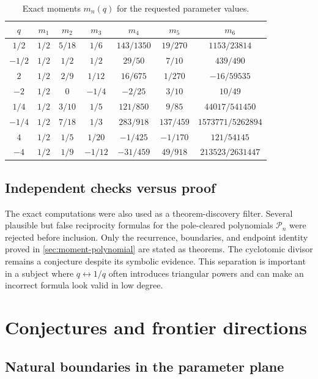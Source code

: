 \documentclass[11pt,oneside]{article}
\numberwithin{equation}{section}
\theoremstyle{definition}
\theoremstyle{remark}
\begin{document}
\begin{table}[H]
\centering
\small
\caption{Exact moments $m_n(q)$ for the requested parameter values.}
\label{tab:moments}
\begin{tabular}{c c c c c c c}
\toprule
$q$ & $m_1$ & $m_2$ & $m_3$ & $m_4$ & $m_5$ & $m_6$ \\
\midrule
$1/2$ & $1/2$ & $5/18$ & $1/6$ & $143/1350$ & $19/270$ & $1153/23814$ \\
$-1/2$ & $1/2$ & $1/2$ & $1/2$ & $29/50$ & $7/10$ & $439/490$ \\
$2$ & $1/2$ & $2/9$ & $1/12$ & $16/675$ & $1/270$ & $-16/59535$ \\
$-2$ & $1/2$ & $0$ & $-1/4$ & $-2/25$ & $3/10$ & $10/49$ \\
\addlinespace
$1/4$ & $1/2$ & $3/10$ & $1/5$ & $121/850$ & $9/85$ & $44017/541450$ \\
$-1/4$ & $1/2$ & $7/18$ & $1/3$ & $283/918$ & $137/459$ & $1573771/5262894$ \\
$4$ & $1/2$ & $1/5$ & $1/20$ & $-1/425$ & $-1/170$ & $121/54145$ \\
$-4$ & $1/2$ & $1/9$ & $-1/12$ & $-31/459$ & $49/918$ & $213523/2631447$ \\
\bottomrule
\end{tabular}
\end{table}

\subsection{Independent checks versus proof}

The exact computations were also used as a theorem-discovery filter.  Several
plausible but false reciprocity formulas for the pole-cleared polynomials
$\mathcal P_n$ were rejected before inclusion.  Only the recurrence,
boundaries, and endpoint identity proved in \cref{sec:moment-polynomial} are
stated as theorems.  The cyclotomic divisor remains a conjecture despite its
symbolic evidence.  This separation is important in a subject where
$q\leftrightarrow1/q$ often introduces triangular powers and can make an
incorrect formula look valid in low degree.

\section{Conjectures and frontier directions}
\label{sec:conjectures}

\subsection{Natural boundaries in the parameter plane}
\end{document}
